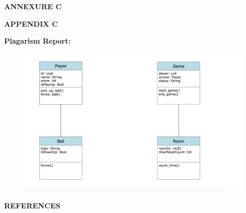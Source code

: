 \documentclass[12pt]{report}
\begin{document}
\clearpage


\centering
\Large\textbf{ANNEXURE C}

\centering

\Large\textbf{APPENDIX C}\\
\justifying
\setlength{\parindent}{4em}
\setlength{\parskip}{0.5em}
\renewcommand{\baselinestretch}{1.5}
\large
\raggedright\textbf{Plagarism Report:}
\vspace{1cm}

\begin{figure}[h]
\centering
\includegraphics[scale=0.9]{images14.png}

\end{figure}
\vspace{15 cm}


\centering
\Large\textbf{REFERENCES}
\justifying
\setlength{\parindent}{4em}
\setlength{\parskip}{0.5em}
\renewcommand{\baselinestretch}{1.5}
\normalsize
\end{document}
